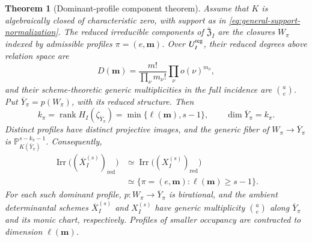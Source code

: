\documentclass[10pt,fleqn]{article}
\numberwithin{equation}{section}
\newtheorem{theorem}{Theorem}[section]
\newcommand{\PP}{\mathbb P}
\newcommand{\rank}{\operatorname{rank}}
\newcommand{\Irr}{\operatorname{Irr}}
\begin{document}
\begin{theorem}[Dominant-profile component theorem]
\label{thm:dominant-profile-components}
Assume that $K$ is algebraically closed of characteristic zero, with support as in
\eqref{eq:general-support-normalization}.  The reduced irreducible components of
$\overline{\mathfrak Z}_I$ are the closures $W_\pi$ indexed by admissible profiles
$\pi=(e,\boldsymbol m)$.  Over $U_I^{\rm reg}$, their reduced degrees above
relation space are
\begin{equation}\label{eq:profile-orbit-degree}
 D(\boldsymbol m)=\frac{m!}{\prod_\nu m_\nu!}\prod_\nu o(\nu)^{m_\nu},
\end{equation}
and their scheme-theoretic generic multiplicities in the full incidence are
$\binom ae$.  Put $\overline Y_\pi=p(W_\pi)$, with its reduced structure.
Then
\begin{equation}\label{eq:profile-rank}
 k_\pi=\rank H_I(\zeta_{\overline Y_\pi})
      =\min\{\ell(\boldsymbol m),s-1\},
 \qquad \dim\overline Y_\pi=k_\pi.
\end{equation}
Distinct profiles have distinct projective images, and the generic fiber of
$W_\pi\to\overline Y_\pi$ is $\PP^{s-k_\pi-1}_{K(\overline Y_\pi)}$.
Consequently,
\begin{equation}\label{eq:X-component-classification}
 \begin{aligned}
 \Irr\bigl((\overline X_I^{(s)})_{\mathrm{red}}\bigr)
 &\simeq\Irr\bigl((X_I^{(s)})_{\mathrm{red}}\bigr)\\
 &\simeq\{\pi=(e,\boldsymbol m):\ell(\boldsymbol m)\ge s-1\}.
 \end{aligned}
\end{equation}
For each such dominant profile, $p:W_\pi\to\overline Y_\pi$ is birational,
and the ambient determinantal schemes $\overline X_I^{(s)}$ and
$X_I^{(s)}$ have generic multiplicity $\binom ae$ along
$\overline Y_\pi$ and its monic chart, respectively.  Profiles of smaller occupancy
are contracted to dimension $\ell(\boldsymbol m)$.
\end{theorem}
\end{document}
